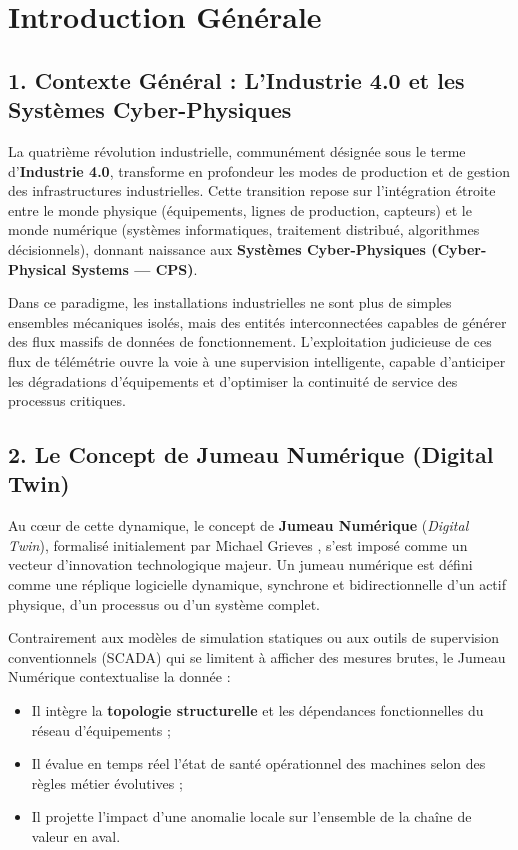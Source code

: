 ﻿\chapter*{Introduction Générale}

\section*{1. Contexte Général : L'Industrie 4.0 et les Systèmes Cyber-Physiques}

La quatrième révolution industrielle, communément désignée sous le terme d'\textbf{Industrie 4.0}, transforme en profondeur les modes de production et de gestion des infrastructures industrielles. Cette transition repose sur l'intégration étroite entre le monde physique (équipements, lignes de production, capteurs) et le monde numérique (systèmes informatiques, traitement distribué, algorithmes décisionnels), donnant naissance aux \textbf{Systèmes Cyber-Physiques (Cyber-Physical Systems --- CPS)}.

Dans ce paradigme, les installations industrielles ne sont plus de simples ensembles mécaniques isolés, mais des entités interconnectées capables de générer des flux massifs de données de fonctionnement. L'exploitation judicieuse de ces flux de télémétrie ouvre la voie à une supervision intelligente, capable d'anticiper les dégradations d'équipements et d'optimiser la continuité de service des processus critiques.

\section*{2. Le Concept de Jumeau Numérique (Digital Twin)}

Au cœur de cette dynamique, le concept de \textbf{Jumeau Numérique} (\textit{Digital Twin}), formalisé initialement par Michael Grieves \cite{grieves2014digital}, s'est imposé comme un vecteur d'innovation technologique majeur. Un jumeau numérique est défini comme une réplique logicielle dynamique, synchrone et bidirectionnelle d'un actif physique, d'un processus ou d'un système complet.

Contrairement aux modèles de simulation statiques ou aux outils de supervision conventionnels (SCADA) qui se limitent à afficher des mesures brutes, le Jumeau Numérique contextualise la donnée :
\begin{itemize}
    \item Il intègre la \textbf{topologie structurelle} et les dépendances fonctionnelles du réseau d'équipements ;
    \item Il évalue en temps réel l'état de santé opérationnel des machines selon des règles métier évolutives ;
    \item Il projette l'impact d'une anomalie locale sur l'ensemble de la chaîne de valeur en aval.
\end{itemize}

